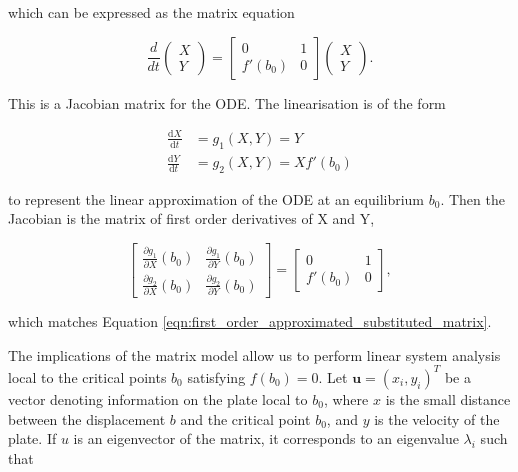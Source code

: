 \documentclass{article}
\begin{document}
which can be expressed as the matrix equation

\begin{equation}
    \frac{d}{dt}\begin{pmatrix}
        X \\
        Y
    \end{pmatrix} = \begin{bmatrix}
        0      & 1 \\
        f'(b_0) & 0
    \end{bmatrix} \begin{pmatrix}
        X \\
        Y
    \end{pmatrix}.
    \label{eqn:first_order_approximated_substituted_matrix}
\end{equation}

This is a Jacobian matrix for the ODE. The linearisation is of the form

\begin{align*}
    \frac{\mathrm{d}X}{\mathrm{d}t} &= g_1(X,Y) = Y \\
    \frac{\mathrm{d}Y}{\mathrm{d}t} &= g_2(X,Y) = Xf'(b_0) 
\end{align*}

to represent the linear approximation of the ODE at an equilibrium \(b_0\). Then the Jacobian is the matrix of first order derivatives of X and Y,

\begin{equation}
    \begin{bmatrix}
        \frac{\partial g_1}{\partial X}(b_0) & \frac{\partial g_1}{\partial Y}(b_0) \\
        \frac{\partial g_2}{\partial X}(b_0) & \frac{\partial g_2}{\partial Y}(b_0) 
    \end{bmatrix} = \begin{bmatrix}
        0 & 1 \\
        f'(b_0) & 0
    \end{bmatrix},
\end{equation}

which matches Equation \ref{eqn:first_order_approximated_substituted_matrix}.



The implications of the matrix model allow us to perform linear system analysis local to the critical points $b_0$ satisfying $f(b_0) = 0.$
Let $\mathbf{u}=(x_i,y_i)^T$ be a vector denoting information on the plate local to $b_0$,
where $x$ is the small distance between the displacement $b$ and the critical point $b_0$,
and $y$ is the velocity of the plate.
If $u$ is an eigenvector of the matrix,
it corresponds to an eigenvalue $\lambda_i$ such that
\end{document}
